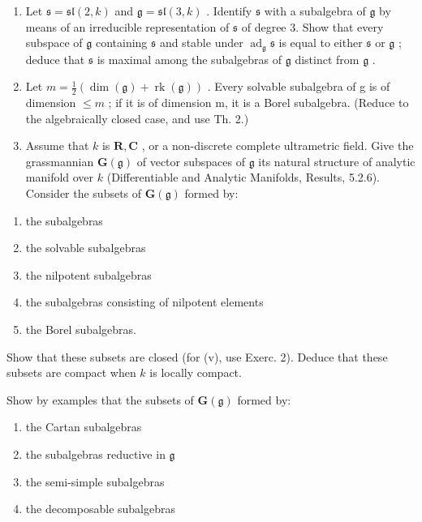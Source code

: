 
\begin{enumerate}
\def\labelenumi{\arabic{enumi})}
\item
  Let \(\mathfrak{s} = \mathfrak{sl}(2, k)\) and \(\mathfrak{g} = \mathfrak{sl}(3, k)\) . Identify \(\mathfrak{s}\) with a subalgebra of \(\mathfrak{g}\) by means of an irreducible representation of \(\mathfrak{s}\) of degree 3. Show that every subspace of \(\mathfrak{g}\) containing \(\mathfrak{s}\) and stable under \(\operatorname{ad}_{\mathfrak{g}}\mathfrak{s}\) is equal to either \(\mathfrak{s}\) or \(\mathfrak{g}\) ; deduce that \(\mathfrak{s}\) is maximal among the subalgebras of \(\mathfrak{g}\) distinct from \(\mathfrak{g}\) .
\item
  Let \(m = \frac{1}{2}(\dim(\mathfrak{g}) + \operatorname{rk}(\mathfrak{g}))\) . Every solvable subalgebra of g is of dimension \(\leq m\) ; if it is of dimension m, it is a Borel subalgebra. (Reduce to the algebraically closed case, and use Th. 2.)
\item
  Assume that \(k\) is \(\mathbf{R}, \mathbf{C}\) , or a non-discrete complete ultrametric field. Give the grassmannian \(\mathbf{G}(\mathfrak{g})\) of vector subspaces of \(\mathfrak{g}\) its natural structure of analytic manifold over \(k\) (Differentiable and Analytic Manifolds, Results, 5.2.6). Consider the subsets of \(\mathbf{G}(\mathfrak{g})\) formed by:
\end{enumerate}

\begin{enumerate}
\def\labelenumi{(\roman{enumi})}
\item
  the subalgebras
\item
  the solvable subalgebras
\item
  the nilpotent subalgebras
\item
  the subalgebras consisting of nilpotent elements
\item
  the Borel subalgebras.
\end{enumerate}

Show that these subsets are closed (for (v), use Exerc. 2). Deduce that these subsets are compact when \(k\) is locally compact.

Show by examples that the subsets of \(\mathbf{G}(\mathfrak{g})\) formed by:

\begin{enumerate}
\def\labelenumi{(\roman{enumi})}
\setcounter{enumi}{5}
\item
  the Cartan subalgebras
\item
  the subalgebras reductive in \(\mathfrak{g}\)
\item
  the semi-simple subalgebras
\item
  the decomposable subalgebras
\end{enumerate}

